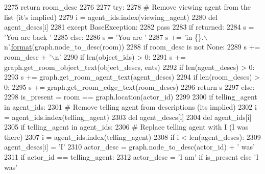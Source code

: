\begin{DoxyCode}
2275                 \textcolor{keywordflow}{return} room\_desc
2276 
2277             \textcolor{keywordflow}{try}:
2278                 \textcolor{comment}{# Remove viewing agent from the list (it's implied)}
2279                 i = agent\_ids.index(viewing\_agent)
2280                 del agent\_descs[i]
2281             \textcolor{keywordflow}{except} BaseException:
2282                 \textcolor{keywordflow}{pass}
2283             \textcolor{keywordflow}{if} returned:
2284                 s = \textcolor{stringliteral}{'You are back '}
2285             \textcolor{keywordflow}{else}:
2286                 s = \textcolor{stringliteral}{'You are '}
2287             s += \textcolor{stringliteral}{'in \{\}.\(\backslash\)n'}.\hyperlink{namespaceparlai_1_1chat__service_1_1services_1_1messenger_1_1shared__utils_a32e2e2022b824fbaf80c747160b52a76}{format}(graph.node\_to\_desc(room))
2288             \textcolor{keywordflow}{if} room\_desc \textcolor{keywordflow}{is} \textcolor{keywordflow}{not} \textcolor{keywordtype}{None}:
2289                 s += room\_desc + \textcolor{stringliteral}{'\(\backslash\)n'}
2290             \textcolor{keywordflow}{if} len(object\_ids) > 0:
2291                 s += graph.get\_room\_object\_text(object\_descs, ents)
2292             \textcolor{keywordflow}{if} len(agent\_descs) > 0:
2293                 s += graph.get\_room\_agent\_text(agent\_descs)
2294             \textcolor{keywordflow}{if} len(room\_descs) > 0:
2295                 s += graph.get\_room\_edge\_text(room\_descs)
2296             \textcolor{keywordflow}{return} s
2297         \textcolor{keywordflow}{else}:
2298             is\_present = room == graph.location(actor\_id)
2299 
2300             \textcolor{keywordflow}{if} telling\_agent \textcolor{keywordflow}{in} agent\_ids:
2301                 \textcolor{comment}{# Remove telling agent from descriptions (its implied)}
2302                 i = agent\_ids.index(telling\_agent)
2303                 del agent\_descs[i]
2304                 del agent\_ids[i]
2305             \textcolor{keywordflow}{if} telling\_agent \textcolor{keywordflow}{in} agent\_ids:
2306                 \textcolor{comment}{# Replace telling agent with I (I was there)}
2307                 i = agent\_ids.index(telling\_agent)
2308                 \textcolor{keywordflow}{if} i < len(agent\_descs):
2309                     agent\_descs[i] = \textcolor{stringliteral}{'I'}
2310             actor\_desc = graph.node\_to\_desc(actor\_id) + \textcolor{stringliteral}{' was'}
2311             \textcolor{keywordflow}{if} actor\_id == telling\_agent:
2312                 actor\_desc = \textcolor{stringliteral}{'I am'} \textcolor{keywordflow}{if} is\_present \textcolor{keywordflow}{else} \textcolor{stringliteral}{'I was'}

\end{DoxyCode}
